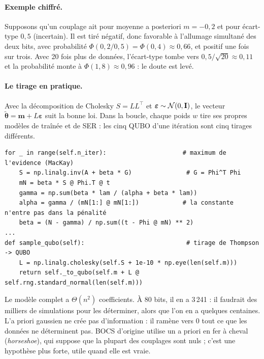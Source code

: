 \paragraph{Exemple chiffré.} Supposons qu'un couplage ait pour moyenne a posteriori $m=-0{,}2$ et pour écart-type $0{,}5$ (incertain). Il est tiré négatif, donc favorable à l'allumage simultané des deux bits, avec probabilité $\Phi(0{,}2/0{,}5)=\Phi(0{,}4)\approx0{,}66$, et positif une fois sur trois. Avec 20 fois plus de données, l'écart-type tombe vers $0{,}5/\sqrt{20}\approx0{,}11$ et la probabilité monte à $\Phi(1{,}8)\approx0{,}96$ : le doute est levé.

\paragraph{Le tirage en pratique.} Avec la décomposition de Cholesky $S=LL^\top$ et $\boldsymbol\varepsilon\sim\mathcal N(0,\mathbf{I})$, le vecteur $\tilde{\boldsymbol\theta}=\mathbf m+L\boldsymbol\varepsilon$ suit la bonne loi. Dans la boucle, chaque poids $w$ tire ses propres modèles de traînée et de SER : les cinq QUBO d'une itération sont cinq tirages différents.

\begin{codebox}
\begin{lstlisting}
for _ in range(self.n_iter):                     # maximum de l'evidence (MacKay)
    S = np.linalg.inv(A + beta * G)               # G = Phi^T Phi
    mN = beta * S @ Phi.T @ t
    gamma = np.sum(beta * lam / (alpha + beta * lam))
    alpha = gamma / (mN[1:] @ mN[1:])            # la constante n'entre pas dans la pénalité
    beta = (N - gamma) / np.sum((t - Phi @ mN) ** 2)
...
def sample_qubo(self):                            # tirage de Thompson -> QUBO
    L = np.linalg.cholesky(self.S + 1e-10 * np.eye(len(self.m)))
    return self._to_qubo(self.m + L @ self.rng.standard_normal(len(self.m)))
\end{lstlisting}
\end{codebox}

\begin{piege}
Le modèle complet a $\Theta(n^2)$ coefficients. À 80 bits, il en a 3\,241 : il faudrait des milliers de simulations pour les déterminer, alors que l'on en a quelques centaines. L'a priori gaussien ne crée pas d'information : il ramène vers 0 tout ce que les données ne déterminent pas. BOCS d'origine utilise un a priori \og en fer à cheval\fg{} (\emph{horseshoe}), qui suppose que la plupart des couplages sont nuls ; c'est une hypothèse plus forte, utile quand elle est vraie.
\end{piege}


